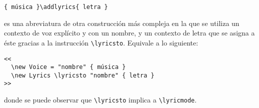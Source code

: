 \begin{verbatim}
{ música }\addlyrics{ letra }
\end{verbatim}

es una abreviatura de otra construcción más compleja en la que se
utiliza un contexto de voz explícito y con un nombre, y un contexto de
letra que se asigna a éste gracias a la instrucción
\verb+\lyricsto+. Equivale a lo siguiente:

\begin{verbatim}
<<
  \new Voice = "nombre" { música }
  \new Lyrics \lyricsto "nombre" { letra }
>>
\end{verbatim}

donde se puede observar que \verb+\lyricsto+ implica a \verb+\lyricmode+.
